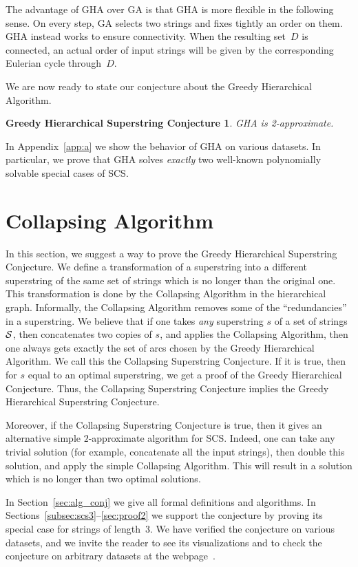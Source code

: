 \documentclass[11pt]{article}
\begin{document}
The advantage of GHA over GA is that GHA is more flexible in the following sense. On every step, GA selects two strings and fixes tightly an order on them. GHA instead works to ensure connectivity. When the resulting set~$D$ is connected, an actual order of input strings will be given by the corresponding Eulerian cycle through~$D$.

We are now ready to state our conjecture about the Greedy Hierarchical Algorithm.
\newtheorem*{ghcc}{Greedy Hierarchical Superstring Conjecture}
\begin{ghcc}
GHA is 2-approximate.
\end{ghcc}
In Appendix~\ref{app:a} we show the behavior of GHA on various datasets. In particular, we prove that GHA solves \emph{exactly} two well-known polynomially solvable special cases of SCS. 

\section{Collapsing Algorithm}
In this section, we suggest a way to prove the Greedy Hierarchical Superstring Conjecture. We define a transformation of a superstring into a different superstring of the same set of strings which is no longer than the original one. This transformation is done by the Collapsing Algorithm in the hierarchical graph. Informally, the Collapsing Algorithm removes some of the ``redundancies'' in a superstring. We believe that if one takes \emph{any} superstring $s$ of a set of strings ${\cal S}$, then concatenates two copies of $s$, and applies the Collapsing Algorithm, then one always gets exactly the set of arcs chosen by the Greedy Hierarchical Algorithm. We call this the Collapsing Superstring Conjecture. If it is true, then for $s$ equal to an optimal superstring, we get a proof of the Greedy Hierarchical Conjecture. Thus, the Collapsing Superstring Conjecture implies the Greedy Hierarchical Superstring Conjecture. 

Moreover, if the Collapsing Superstring Conjecture is true, then it gives an alternative simple $2$-approximate algorithm for SCS. Indeed, one can take any trivial solution (for example, concatenate all the input strings), then double this solution, and apply the simple Collapsing Algorithm. This will result in a solution which is no longer than two optimal solutions.

In Section~\ref{sec:alg_conj} we give all formal definitions and algorithms. In Sections~\ref{subsec:scs3}--\ref{sec:proof2} we support the conjecture by proving its special case for strings of length~3. We have verified the conjecture on various datasets, and we invite the reader to see its visualizations and to check the conjecture on arbitrary datasets at the webpage~\cite{webpage}.
\end{document}
